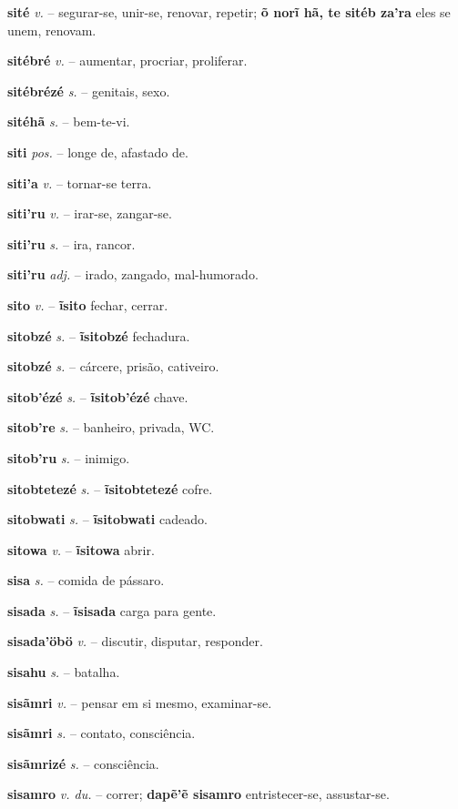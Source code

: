 \textbf{sité} \textit{v.} -- segurar-se, unir-se, renovar, repetir; \textbf{õ norĩ hã, te sitéb za'ra} eles se unem, renovam.

\textbf{sitébré} \textit{v.} -- aumentar, procriar, proliferar.

\textbf{sitébrézé} \textit{s.} -- genitais, sexo.

\textbf{sitéhã} \textit{s.} -- bem-te-vi.

\textbf{siti} \textit{pos.} -- longe de, afastado de.

\textbf{siti'a} \textit{v.} -- tornar-se terra.

\textbf{siti'ru} \textit{v.} -- irar-se, zangar-se.

\textbf{siti'ru} \textit{s.} -- ira, rancor.

\textbf{siti'ru} \textit{adj.} -- irado, zangado, mal-humorado.

\textbf{sito} \textit{v.} -- \textbf{ĩsito} fechar, cerrar.

\textbf{sitobzé} \textit{s.} -- \textbf{ĩsitobzé} fechadura.

\textbf{sitobzé} \textit{s.} -- cárcere, prisão, cativeiro.

\textbf{sitob'ézé} \textit{s.} -- \textbf{ĩsitob'ézé} chave.

\textbf{sitob're} \textit{s.} -- banheiro, privada, WC.

\textbf{sitob'ru} \textit{s.} -- inimigo.

\textbf{sitobtetezé} \textit{s.} -- \textbf{ĩsitobtetezé} cofre.

\textbf{sitobwati} \textit{s.} -- \textbf{ĩsitobwati} cadeado.

\textbf{sitowa} \textit{v.} -- \textbf{ĩsitowa} abrir.

\textbf{sisa} \textit{s.} -- comida de pássaro.

\textbf{sisada} \textit{s.} -- \textbf{ĩsisada} carga para gente.

\textbf{sisada'öbö} \textit{v.} -- discutir, disputar, responder.

\textbf{sisahu} \textit{s.} -- batalha.

\textbf{sisãmri} \textit{v.} -- pensar em si mesmo, examinar-se.

\textbf{sisãmri} \textit{s.} -- contato, consciência.

\textbf{sisãmrizé} \textit{s.} -- consciência.

\textbf{sisamro} \textit{v. du.} -- correr; \textbf{dapẽ'ẽ sisamro} entristecer-se, assustar-se.

